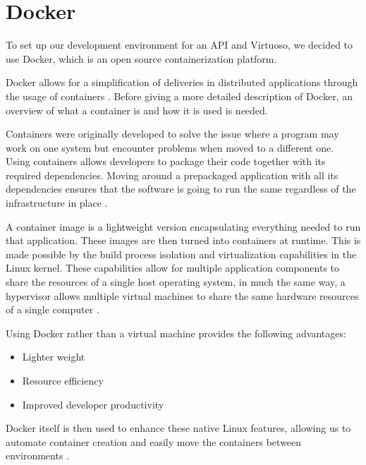 \section{Docker}
To set up our development environment for an API and Virtuoso, we decided to use Docker, which is an open source containerization platform.

Docker allows for a simplification of deliveries in distributed applications through the usage of containers \cite{Container_Docker}. 
Before giving a more detailed description of Docker, an overview of what a container is and how it is used is needed. 


Containers were originally developed to solve the issue where a program may work on one system but encounter problems when moved to a different one. 
Using containers allows developers to package their code together with its required dependencies. 
Moving around a prepackaged application with all its dependencies ensures that the software is going to run the same regardless of the infrastructure in place \cite{Container_Docker}.


A container image is a lightweight version encapsulating everything needed to run that application. These images are then turned into containers at runtime. 
This is made possible by the build process isolation and virtualization capabilities in the Linux kernel. 
These capabilities allow for multiple application components to share the resources of a single host operating system, in much the same way, a hypervisor allows multiple virtual machines to share the same hardware resources of a single computer \cite{Container_Docker}.


Using Docker rather than a virtual machine provides the following advantages:

\begin{itemize}
    \item Lighter weight
    \item Resource efficiency
    \item Improved developer productivity
\end{itemize}

Docker itself is then used to enhance these native Linux features, allowing us to automate container creation and easily move the containers between environments \cite{Docker_IBM}.